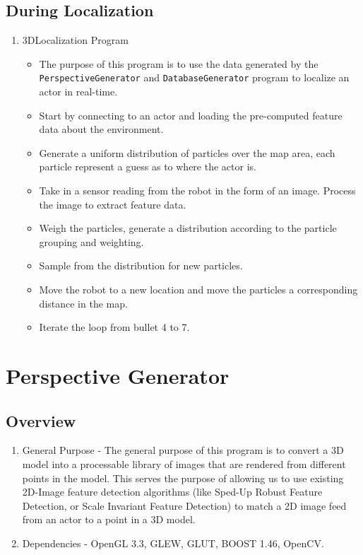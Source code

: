 \documentclass[a4paper,11pt]{article}
\begin{document}
        \subsection{During Localization}
        \begin{enumerate}
        \item 3DLocalization Program
            \begin{itemize}
            \item The purpose of this program is to use the data generated by the \texttt{PerspectiveGenerator} and \texttt{DatabaseGenerator} program to localize an actor in real-time. 
            \item Start by connecting to an actor and loading the pre-computed feature data about the environment.
            \item Generate a uniform distribution of particles over the map area, each particle represent a guess as to where the actor is.
            \item Take in a sensor reading from the robot in the form of an image. Process the image to extract feature data.
            \item Weigh the particles, generate a distribution according to the particle grouping and weighting.
            \item Sample from the distribution for new particles.
            \item Move the robot to a new location and move the particles a corresponding distance in the map.
            \item Iterate the loop from bullet 4 to 7.
            \end{itemize}
        \end{enumerate}
        \newpage

    \section{Perspective Generator}

        \subsection{Overview}
        \begin{enumerate}
        \item General Purpose - The general purpose of this program is to convert a 3D model into a processable library of images that are rendered from different points in the model. This serves the purpose of allowing us to use existing 2D-Image feature detection algorithms (like Sped-Up Robust Feature Detection, or Scale Invariant Feature Detection) to match a 2D image feed from an actor to a point in a 3D model.
        \item Dependencies - OpenGL 3.3, GLEW, GLUT, BOOST 1.46, OpenCV.
        \end{enumerate}
\end{document}
